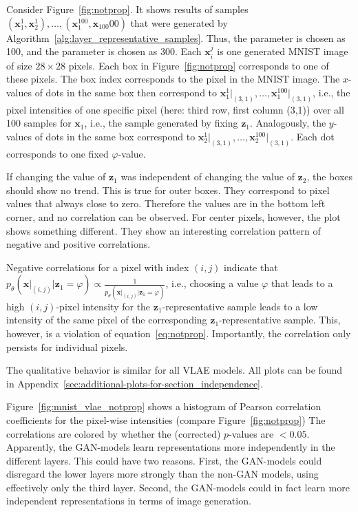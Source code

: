 Consider Figure~\ref{fig:notprop}.
It shows results of samples $(\bm{x}_1^1,\bm{x}_2^1),\dots,(\bm{x}_1^{100},\bm{x}_{100}00)$ that were generated by Algorithm~\ref{alg:layer_representative_samples}.
Thus, the parameter  is chosen as 100, and the parameter  is chosen as 300.
Each $\bm{x}_i^j$ is one generated MNIST image of size $28\times 28$ pixels.
Each box in Figure~\ref{fig:notprop} corresponds to one of these pixels.
The box index corresponds to the pixel in the MNIST image.
The $x$-values of dots in the same box then correspond to $\bm{x}_1^1\big|_{(3,1)}, \dots, \bm{x}_1^{100}\big|_{(3,1)}$, i.e., the pixel intensities of one specific pixel (here: third row, first column (3,1)) over all 100 samples for $\bm{x}_1$, i.e., the sample generated by fixing $\bm{z}_1$.
Analogously, the $y$-values of dots in the same box correspond to $\bm{x}_2^1\big|_{(3,1)}, \dots, \bm{x}_2^{100}\big|_{(3,1)}$.
Each dot corresponds to one fixed $\varphi$-value.

If changing the value of $\bm{z}_1$ was independent of changing the value of $\bm{z}_2$, the boxes should show no trend.
This is true for outer boxes.
They correspond to pixel values that always close to zero.
Therefore the values are in the bottom left corner, and no correlation can be observed.
For center pixels, however, the plot shows something different.
They show an interesting correlation pattern of negative and positive correlations.

Negative correlations for a pixel with index $(i,j)$ indicate that $p_\theta(\bm{x}\big|_{(i,j)} | \bm{z}_1 = \varphi) \propto \frac{1}{p_\theta(\bm{x}\big|_{(i,j)} | \bm{z}_1 = \varphi)}$, i.e., choosing a value $\varphi$ that leads to a high $(i,j)$-pixel intensity for the $\bm{z}_1$-representative sample leads to a low intensity of the same pixel of the corresponding $\bm{z}_1$-representative sample.
This, however, is a violation of equation~\ref{eq:notprop}.
Importantly, the correlation only persists for individual pixels.

The qualitative behavior is similar for all \ac{VLAE} models.
All plots can be found in Appendix~\ref{sec:additional-plots-for-section_independence}.

Figure~\ref{fig:mnist_vlae_notprop} shows a histogram of Pearson correlation coefficients for the pixel-wise intensities (compare Figure~\ref{fig:notprop})
The correlations are colored by whether the (corrected) $p$-values are $< 0.05$.
Apparently, the \ac{GAN}-models learn representations more independently in the different layers.
This could have two reasons.
First, the \ac{GAN}-models could disregard the lower layers more strongly than the non-\ac{GAN} models, using effectively only the third layer.
Second, the \ac{GAN}-models could in fact learn more independent representations in terms of image generation.

